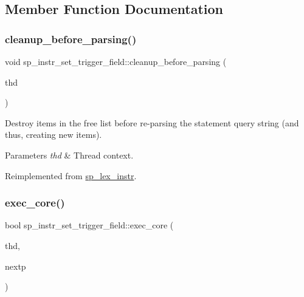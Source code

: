 \subsection{Member Function Documentation}
\mbox{\label{classsp__instr__set__trigger__field_a7dfa25f3120b0f312d0606c3ea9f8074}} 
\subsubsection{\texorpdfstring{cleanup\+\_\+before\+\_\+parsing()}{cleanup\_before\_parsing()}}
{\footnotesize\ttfamily void sp\+\_\+instr\+\_\+set\+\_\+trigger\+\_\+field\+::cleanup\+\_\+before\+\_\+parsing (\begin{DoxyParamCaption}\item[{T\+HD $\ast$}]{thd }\end{DoxyParamCaption})\hspace{0.3cm}{\ttfamily [virtual]}}

Destroy items in the free list before re-\/parsing the statement query string (and thus, creating new items).


\begin{DoxyParams}{Parameters}
{\em thd} & Thread context. \\
\hline
\end{DoxyParams}


Reimplemented from \mbox{\hyperlink{classsp__lex__instr_aea0d857d412f89095bde90fa083e8c24}{sp\+\_\+lex\+\_\+instr}}.

\mbox{\label{classsp__instr__set__trigger__field_abec18ffff701e30c978cbece096e5c72}} 
\subsubsection{\texorpdfstring{exec\+\_\+core()}{exec\_core()}}
{\footnotesize\ttfamily bool sp\+\_\+instr\+\_\+set\+\_\+trigger\+\_\+field\+::exec\+\_\+core (\begin{DoxyParamCaption}\item[{T\+HD $\ast$}]{thd,  }\item[{uint $\ast$}]{nextp }\end{DoxyParamCaption})\hspace{0.3cm}{\ttfamily [virtual]}}

